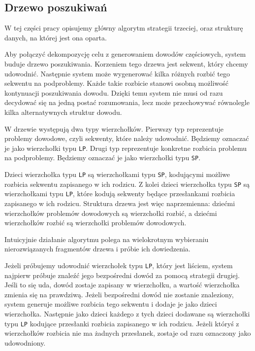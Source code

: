 \documentclass[shortabstract]{iithesis}
\theoremstyle{definition}
\theoremstyle{remark}
\theoremstyle{plain}
\begin{document}
\subsection{Drzewo poszukiwań}

W tej części pracy opisujemy główny algorytm strategii trzeciej, oraz strukturę danych, na której jest ona oparta.

Aby połączyć dekompozycję celu z generowaniem dowodów częściowych, system
buduje drzewo poszukiwania. Korzeniem tego drzewa jest sekwent, który chcemy
udowodnić. Następnie system może wygenerować kilka różnych rozbić tego sekwentu
na podproblemy. Każde takie rozbicie stanowi osobną możliwość kontynuacji
poszukiwania dowodu. Dzięki temu system nie musi od razu decydować się na jedną
postać rozumowania, lecz może przechowywać równolegle kilka alternatywnych
struktur dowodu.

W drzewie występują dwa typy wierzchołków. Pierwszy typ reprezentuje problemy
dowodowe, czyli sekwenty, które należy udowodnić. Będziemy oznaczać je jako
wierzchołki typu \texttt{LP}. Drugi typ reprezentuje konkretne rozbicia problemu na
podproblemy. Będziemy oznaczać je jako wierzchołki typu \texttt{SP}.

Dzieci wierzchołka typu \texttt{LP} są wierzchołkami typu \texttt{SP}, kodującymi
możliwe rozbicia sekwentu zapisanego w ich rodzicu. Z kolei dzieci wierzchołka typu
\texttt{SP} są wierzchołkami typu \texttt{LP}, które kodują sekwenty będące
przesłankami rozbicia zapisanego w ich rodzicu. Struktura drzewa jest więc
naprzemienna: dziećmi wierzchołków problemów dowodowych są wierzchołki rozbić, 
a dziećmi wierzchołków rozbić są wierzchołki problemów dowodowych.

Intuicyjnie działanie algorytmu polega na wielokrotnym wybieraniu nierozwiązanych
fragmentów drzewa i próbie ich dowiedzenia. 

Jeżeli próbujemy udowodnić wierzchołek typu \texttt{LP}, który jest liściem, system najpierw próbuje znaleźć
jego bezpośredni dowód za pomocą strategii drugiej. Jeśli to się uda, dowód
zostaje zapisany w wierzchołku, a wartość wierzchołka zmienia się na prawdziwą.
Jeżeli bezpośredni dowód nie zostanie znaleziony, system generuje możliwe rozbicia
tego sekwentu i dodaje je jako dzieci wierzchołka. Następnie jako dzieci każdego
z tych dzieci dodawane są wierzchołki typu \texttt{LP} kodujące przesłanki
rozbicia zapisanego w ich rodzicu. Jeżeli któryś z wierzchołków rozbicia nie ma
żadnych przesłanek, zostaje od razu oznaczony jako udowodniony.
\end{document}
